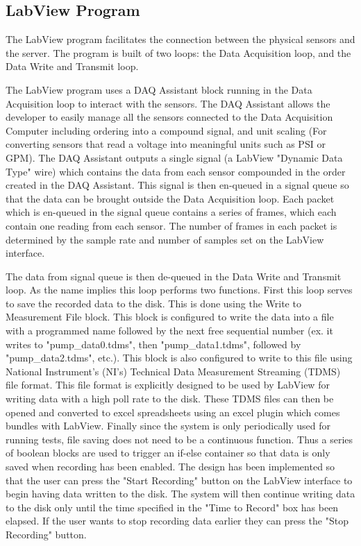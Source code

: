 \documentclass[10pt,technote]{IEEEtran}
\begin{document}
\subsection{LabView Program}
The LabView program facilitates the connection between the physical sensors and the server. The program is built of two loops: the Data Acquisition loop, and the Data Write and Transmit loop.
\par
The LabView program uses a DAQ Assistant block running in the Data Acquisition loop to interact with the sensors. The DAQ Assistant allows the developer to easily manage all the sensors connected to the Data Acquisition Computer including ordering into a compound signal, and unit scaling (For converting sensors that read a voltage into meaningful units such as PSI or GPM). The DAQ Assistant outputs a single signal (a LabView "Dynamic Data Type" wire) which contains the data from each sensor compounded in the order created in the DAQ Assistant. This signal is then en-queued in a signal queue so that the data can be brought outside the Data Acquisition loop. Each packet which is en-queued in the signal queue contains a series of frames, which each contain one reading from each sensor. The number of frames in each packet is determined by the sample rate and number of samples set on the LabView interface.
\par
The data from signal queue is then de-queued in the Data Write and Transmit loop. As the name implies this loop performs two functions. First this loop serves to save the recorded data to the disk. This is done using the Write to Measurement File block. This block is configured to write the data into a file with a programmed name followed by the next free sequential number (ex. it writes to "pump\_data0.tdms", then "pump\_data1.tdms", followed by "pump\_data2.tdms", etc.). This block is also configured to write to this file using National Instrument's (NI's) Technical Data Measurement Streaming (TDMS) file format. This file format is explicitly designed to be used by LabView for writing data with a high poll rate to the disk. These TDMS files can then be opened and converted to excel spreadsheets using an excel plugin which comes bundles with LabView. Finally since the system is only periodically used for running tests, file saving does not need to be a continuous function. Thus a series of boolean blocks are used to trigger an if-else container so that data is only saved when recording has been enabled. The design has been implemented so that the user can press the "Start Recording" button on the LabView interface to begin having data written to the disk. The system will then continue writing data to the disk only until the time specified in the "Time to Record" box has been elapsed. If the user wants to stop recording data earlier they can press the "Stop Recording" button.
\end{document}
